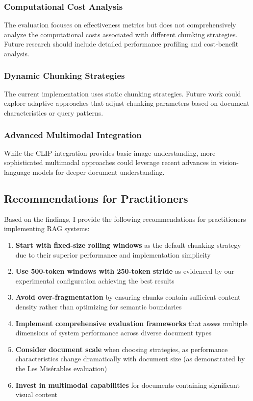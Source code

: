 \documentclass[11pt,a4paper]{article}
\begin{document}
\subsubsection{Computational Cost Analysis}

The evaluation focuses on effectiveness metrics but does not comprehensively analyze the computational costs associated with different chunking strategies. Future research should include detailed performance profiling and cost-benefit analysis.

\subsubsection{Dynamic Chunking Strategies}

The current implementation uses static chunking strategies. Future work could explore adaptive approaches that adjust chunking parameters based on document characteristics or query patterns.

\subsubsection{Advanced Multimodal Integration}

While the CLIP integration provides basic image understanding, more sophisticated multimodal approaches could leverage recent advances in vision-language models for deeper document understanding.

\subsection{Recommendations for Practitioners}

Based on the findings, I provide the following recommendations for practitioners implementing RAG systems:

\begin{enumerate}
\item \textbf{Start with fixed-size rolling windows} as the default chunking strategy due to their superior performance and implementation simplicity
\item \textbf{Use 500-token windows with 250-token stride} as evidenced by our experimental configuration achieving the best results
\item \textbf{Avoid over-fragmentation} by ensuring chunks contain sufficient content density rather than optimizing for semantic boundaries
\item \textbf{Implement comprehensive evaluation frameworks} that assess multiple dimensions of system performance across diverse document types
\item \textbf{Consider document scale} when choosing strategies, as performance characteristics change dramatically with document size (as demonstrated by the Les Misérables evaluation)
\item \textbf{Invest in multimodal capabilities} for documents containing significant visual content
\end{enumerate}
\end{document}
